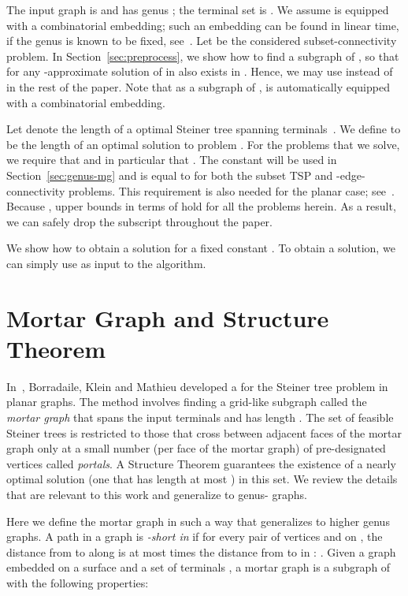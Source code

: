 \documentclass{article}
\begin{document}
The input graph is  and has genus ; the
terminal set is . We assume  is equipped with a combinatorial
embedding; such an embedding can be found in linear time, if the genus
is known to be fixed, see~\cite{Mohar99}. Let  be the considered
subset-connectivity problem. In Section~\ref{sec:preprocess}, we show
how to find a subgraph  of , so that for  any -approximate solution of  in
 also exists in . Hence, we may use  instead of 
in the rest of the paper. Note that as a subgraph of ,  is
automatically equipped with a combinatorial embedding.

Let  denote the length of a optimal Steiner tree spanning
terminals~. We define  to be the length of an
optimal solution to problem .  For the problems that we
solve, we require that  and in
particular that .  The
constant  will be used in Section~\ref{sec:genus-mg} and is equal
to  for both the subset TSP and -edge-connectivity
problems.  This requirement is also needed for the planar case;
see~\cite{BorradaileKlein08}.  Because , upper bounds
in terms of  hold for all the problems herein.  As a result, we
can safely drop the  subscript throughout the paper.

We show how to obtain a  solution for
a fixed constant .  To obtain a 
solution, we can simply use  as input to the
algorithm.



\section{Mortar Graph and Structure Theorem}
\label{sec:mg}

In~\cite{BorradaileKM09}, Borradaile, Klein
and Mathieu developed a  for the Steiner tree problem in planar
graphs.  The method involves finding a grid-like subgraph called the
{\em mortar graph} that spans the input terminals and has length
.  The set of feasible Steiner trees is restricted to those
that cross between adjacent faces of the mortar graph only at a small
number (per face of the mortar graph) of pre-designated vertices
called {\em portals}.  A Structure Theorem guarantees the existence of
a nearly optimal solution (one that has length at most
) in this set.  We review the details that are
relevant to this work and generalize to genus- graphs.

Here we define the mortar graph in such a way that generalizes to
higher genus graphs.  A path  in a graph  is {\em
  -short in } if for every pair of vertices  and 
on , the distance from  to  along  is at most
 times the distance from  to  in :
.  Given a graph 
embedded on a surface and a set of terminals , a mortar graph is a
subgraph of  with the following properties:
\end{document}
